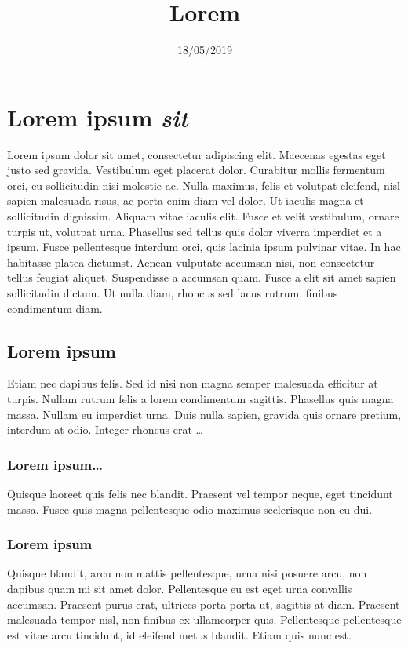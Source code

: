 \title{Lorem}
\date{18/05/2019}


\maketitle

\section{Lorem ipsum \textit{sit}}

Lorem ipsum dolor sit amet, consectetur adipiscing elit. Maecenas egestas eget justo sed gravida. Vestibulum eget placerat dolor. Curabitur mollis fermentum orci, eu sollicitudin nisi molestie ac. Nulla maximus, felis et volutpat eleifend, nisl sapien malesuada risus, ac porta enim diam vel dolor. Ut iaculis magna et sollicitudin dignissim. Aliquam vitae iaculis elit. Fusce et velit vestibulum, ornare turpis ut, volutpat urna. Phasellus sed tellus quis dolor viverra imperdiet et a ipsum. Fusce pellentesque interdum orci, quis lacinia ipsum pulvinar vitae. In hac habitasse platea dictumst. Aenean vulputate accumsan nisi, non consectetur tellus feugiat aliquet. Suspendisse a accumsan quam. Fusce a elit sit amet sapien sollicitudin dictum. Ut nulla diam, rhoncus sed lacus rutrum, finibus condimentum diam. 

\subsection{Lorem ipsum}

Etiam nec dapibus felis. Sed id nisi non magna semper malesuada efficitur at turpis. Nullam rutrum felis a lorem condimentum sagittis. Phasellus quis magna massa. Nullam eu imperdiet urna. Duis nulla sapien, gravida quis ornare pretium, interdum at odio. Integer rhoncus erat 
\ldots

\subsubsection{Lorem ipsum\ldots}

Quisque laoreet quis felis nec blandit. Praesent vel tempor neque, eget tincidunt massa. Fusce quis magna pellentesque odio maximus scelerisque non eu dui.

\subsubsection{Lorem ipsum}

Quisque blandit, arcu non mattis pellentesque, urna nisi posuere arcu, non dapibus quam mi sit amet dolor. Pellentesque eu est eget urna convallis accumsan. Praesent purus erat, ultrices porta porta ut, sagittis at diam. Praesent malesuada tempor nisl, non finibus ex ullamcorper quis. Pellentesque pellentesque est vitae arcu tincidunt, id eleifend metus blandit. Etiam quis nunc est.

